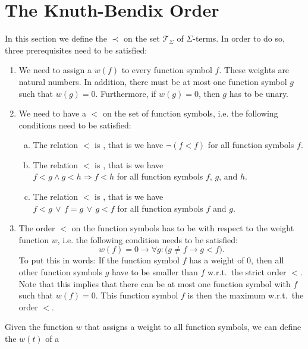 \section{The Knuth-Bendix Order}
In this section we define the  $\prec$ on the set $\mathcal{T}_\Sigma$ of
$\Sigma$-terms.  In order to do so, three prerequisites need to be satisfied:
\begin{enumerate}
\item We need to assign a  $w(f)$ to every function symbol $f$.  These weights are 
      natural numbers.  In addition, there must be at most one function symbol $g$ such that $w(g) = 0$.
      Furthermore, if $w(g) = 0$, then $g$ has to be unary.
\item We need to have a  $<$ on the set of function symbols, i.e. the following
      conditions need to be satisfied:
      \begin{enumerate}[(a)]
      \item The relation $<$ is , that is we have $\neg (f < f)$ for all function symbols $f$.
      \item The relation $<$ is , that is we have 
            \\[0.2cm]
            \hspace*{1.3cm}
            $f < g \wedge g < h \Rightarrow f < h$ \quad for all function symbols $f$, $g$, and $h$.
      \item The relation $<$ is , that is we have 
            \\[0.2cm]
            \hspace*{1.3cm}
            $f < g \,\vee\, f = g \,\vee\, g < f$ \quad for all function symbols $f$ and $g$.
      \end{enumerate}
\item The order $<$ on the function symbols has to be  with respect to the weight function
      $w$, i.e. the following condition needs to be satisfied:
   $$ w(f) = 0 \rightarrow \forall g:  \bigl(g \not=f \rightarrow g < f\bigr). $$
      To put this in words: If the function symbol $f$ has a weight of $0$, then 
      all other function symbols $g$ have to be smaller than $f$ w.r.t.~the strict order $<$.
      Note that this implies that there can be at most one function symbol with $f$ such that $w(f) = 0$. 
      This function symbol $f$ is then the maximum w.r.t.~the order $<$.
\end{enumerate}
Given the function $w$ that assigns a weight to all function symbols, we can define the  $w(t)$ of a
